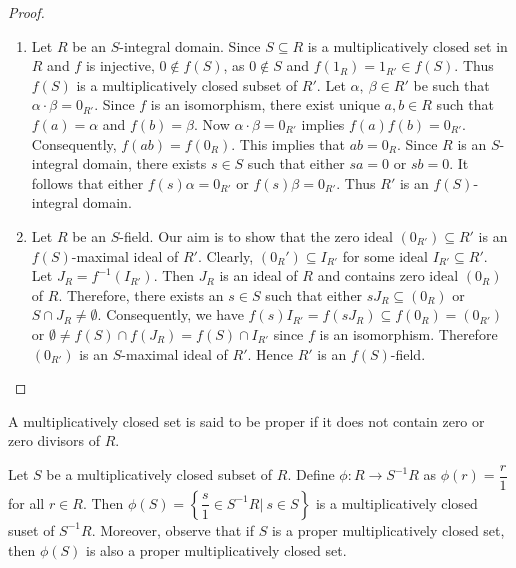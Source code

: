 \documentclass[11pt]{article}
\begin{document}
	\begin{proof}
		\leavevmode
		\begin{enumerate}
			\item Let $R$ be an $S$-integral domain. Since $S\subseteq R$ is a multiplicatively closed set in $R$ and $f$ is injective, $0\notin f(S)$, as $0\notin S$ and $f(1_{R})=1_{R'}\in f(S)$. Thus $f(S)$ is a multiplicatively closed subset of $R'$. Let $\alpha, ~\beta \in R'$ be such that $\alpha\cdot \beta=0_{R'}$. Since $f$ is an isomorphism, there exist unique $a, b\in R$ such that $f(a)=\alpha$ and $f(b)=\beta$. Now $\alpha\cdot \beta=0_{R'}$ implies $f(a)f(b)=0_{R'}$. Consequently, $f(ab)=f(0_{R})$. This implies that $ab=0_{R}$. Since $R$ is an $S$-integral domain, there exists $s\in S$ such that either $sa=0$ or $sb=0$. It follows that either $f(s)\alpha=0_{R'}$ or $f(s)\beta=0_{R'}$. Thus $R'$ is an $f(S)$-integral domain.
			\item Let $R$ be an $S$-field. Our aim is to show that the zero ideal $(0_{R'})\subseteq R'$ is an $f(S)$-maximal ideal of $R'$. Clearly, $(0_R')\subseteq I_{R'}$ for some ideal $I_{R'}\subseteq R'$. Let $J_R=f^{-1}(I_{R'}).$ Then $J_R$ is an ideal of $R$ and contains zero ideal $(0_R)$ of $R.$ Therefore, there exists an $s\in S$ such that either $sJ_{R}\subseteq (0_{R})$ or $S\cap J_{R}\neq \emptyset$. Consequently, we have $f(s)I_{R'}=f(sJ_{R})\subseteq f(0_{R})=(0_{R'})$ or $\emptyset\neq f(S)\cap f(J_{R})=f(S)\cap I_{R'}$ since $f$ is an isomorphism. Therefore $(0_{R'})$ is an $S$-maximal ideal of $R'$. Hence $R'$ is an $f(S)$-field.
		\end{enumerate}
	\end{proof}
 \begin{deff}
        A multiplicatively closed set is said to be proper if it does not contain zero or zero divisors of $R$. 
    \end{deff}
    
\begin{rem}\label{mul}
Let $S$ be a multiplicatively closed subset of $R$.	Define $\phi: R \to S^{-1}R$ as $\phi(r)=\dfrac{r}{1}$ for all $r\in R$. Then $\phi(S) =\left \{\dfrac{s}{1}\in S^{-1}R |\ s\in S\right\}$ is a multiplicatively closed suset of $S^{-1}R$. Moreover, observe that if  $S$ is a proper multiplicatively closed set, then $\phi(S)$ is also a proper multiplicatively closed set.
	\end{rem}
	
\end{document}
